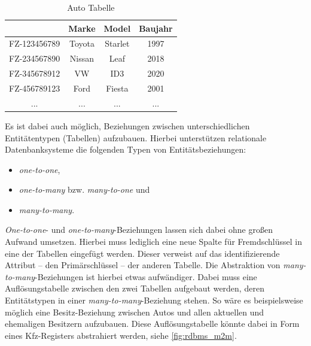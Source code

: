 \begin{table}[h]
    \centering
    \begin{tabular}{c|c|c|c}
    \hline
    \rowcolor[HTML]{EFEFEF} 
    \multicolumn{1}{l|}{\cellcolor[HTML]{EFEFEF}\textbf{Fahrzeugnummer}} & \multicolumn{1}{l|}{\cellcolor[HTML]{EFEFEF}\textbf{Marke}} & \multicolumn{1}{l|}{\cellcolor[HTML]{EFEFEF}\textbf{Model}} & \multicolumn{1}{l}{\cellcolor[HTML]{EFEFEF}\textbf{Baujahr}} \\ \hline
    FZ-123456789 & Toyota & Starlet & 1997 \\
    FZ-234567890 & Nissan & Leaf & 2018 \\
    FZ-345678912 & VW & ID3 & 2020 \\
    FZ-456789123 & Ford & Fiesta & 2001 \\
    ... & ... & ... & ... \\ \hline
    \end{tabular}
    \caption{Auto Tabelle}
    \label{tab:auto_table}
\end{table}

Es ist dabei auch möglich, Beziehungen zwischen unterschiedlichen Entitätentypen (Tabellen) aufzubauen. Hierbei unterstützen relationale Datenbanksysteme die folgenden Typen von Entitätsbeziehungen: 
\begin{itemize}
    \item \textit{one-to-one}, 
    \item \textit{one-to-many} bzw. \textit{many-to-one} und 
    \item \textit{many-to-many}.
\end{itemize}
\textit{One-to-one}- und \textit{one-to-many}-Beziehungen lassen sich dabei ohne großen Aufwand umsetzen. Hierbei muss lediglich eine neue Spalte für Fremdschlüssel in eine der Tabellen eingefügt werden. Dieser verweist auf das identifizierende Attribut -- den Primärschlüssel -- der anderen Tabelle. Die Abstraktion von \textit{many-to-many}-Beziehungen ist hierbei etwas aufwändiger. Dabei muss eine Auflösungstabelle zwischen den zwei Tabellen aufgebaut werden, deren Entitätstypen in einer \textit{many-to-many}-Beziehung stehen. So wäre es beispielsweise möglich eine Besitz-Beziehung zwischen Autos und allen aktuellen und ehemaligen Besitzern aufzubauen. Diese Auflösungstabelle könnte dabei in Form eines Kfz-Registers abstrahiert werden, siehe \autoref{fig:rdbms_m2m}.

